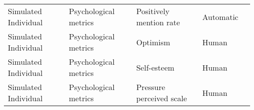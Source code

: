\begin{small}
\begin{center}
\begin{longtable}{@{}p{}p{}p{}p{}p{}@{}}
Simulated Individual     & Psychological metrics & Positively mention rate                                                                                                                                                                                     & Automatic & \cite{kamruzzaman2024exploringchangesnationperception}                                                                                                                                                                                                                                                                                                                                                                                            \\
Simulated Individual     & Psychological metrics & Optimism                                                                                                                                                                                                    & Human     & \cite{Pataranutaporn2024FutureYA}                                                                                                                                                                                                                                                                                                                                                                                                  \\
Simulated Individual     & Psychological metrics & Self-esteem                                                                                                                                                                                                 & Human     & \cite{Pataranutaporn2024FutureYA}                                                                                                                                                                                                                                                                                                                                                                                                  \\
Simulated Individual     & Psychological metrics & Pressure perceived scale                                                                                                                                                                                    & Human     & \cite{Liu2024ComPeerAG}                                                                                                                                                                                                                                                                                                                                                                              \\

\end{longtable}
\end{center}
\end{small}
